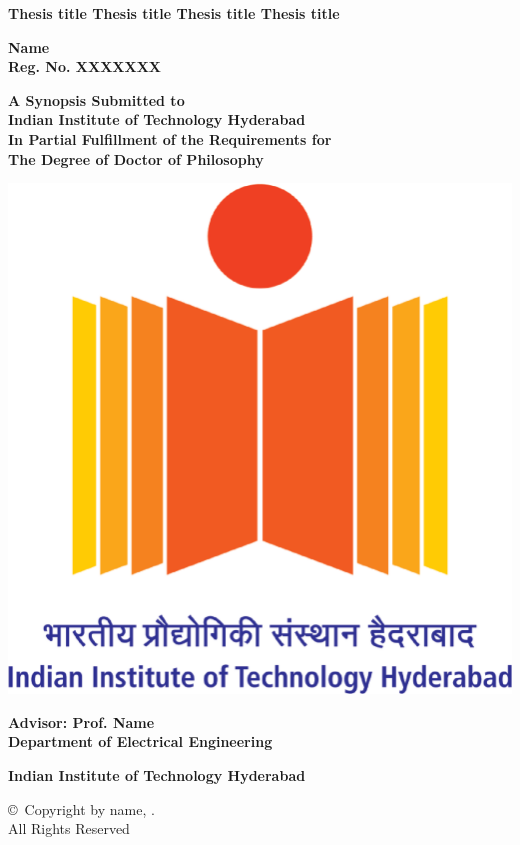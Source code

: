 \documentclass[12pt,a4paper,oneside]{report}
\begin{document}
\thispagestyle{empty}
\begin{center}
    \vspace{0.3in}
   {\Large\bf{Thesis title Thesis title Thesis title Thesis title} \\}
   
			     \vspace{0.7in}
			    {\large \bf Name \\
			    Reg. No. XXXXXXX\\}
			 
			  \vspace{0.7 in}

		       {\bf{A Synopsis Submitted to} \\ Indian Institute of Technology Hyderabad \\
In Partial Fulfillment of the Requirements for \\
The Degree of Doctor of Philosophy}
		       
		       \vspace{0.7 in}

		       

	      \includegraphics[width=0.30\linewidth]{logo.png}
 \vspace{0.7in}

			 {\large{\bf Advisor:  Prof. Name}\\}		    
                \vspace{0.3in}
		     {\large\bf Department of Electrical Engineering\\}
   
			 {\large\bf  Indian Institute of Technology Hyderabad \\}
               \begin{center}
    \copyright\ Copyright by \@author name, \number\year. \\
    All Rights Reserved
  \end{center}
  
\end{center}
\date{}
\setcounter{page}{0}
\newpage
\end{document}
